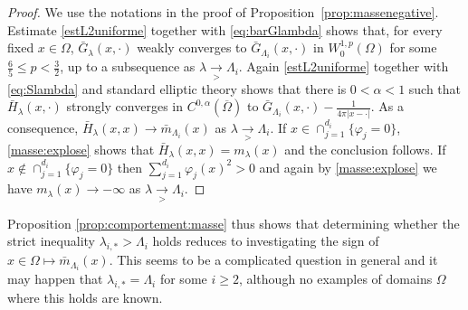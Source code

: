 \documentclass[10pt]{amsart}
\numberwithin{equation}{section}
\newcommand{\vp}{\varphi}
\newcommand{\Om}{\Omega}
\theoremstyle{plain}
\theoremstyle{remark}
\begin{document}
\begin{proof}
We use the notations in the proof of Proposition~\ref{prop:massenegative}. Estimate \eqref{estL2uniforme} together with \eqref{eq:barGlambda} shows that, for every fixed $x \in \Om$, $\bar{G}_\lambda(x, \cdot)$ weakly converges to $\bar{G}_{\Lambda_i}(x, \cdot)$ in $W^{1,p}_0(\Om)$ for some $ \frac{6}{5} \le p < \frac32$,  up to a subsequence as $\lambda\underset{> }{\to} \Lambda_{i}$. Again \eqref{estL2uniforme} together with \eqref{eq:Slambda} and standard elliptic theory shows that there is $0 < \alpha < 1$ such that $\bar{H}_\lambda(x, \cdot)$ strongly converges in $C^{0,\alpha}(\overline{\Om})$ to $\bar{G}_{\Lambda_i}(x, \cdot) - \frac{1}{4 \pi |x - \cdot|}$. As a consequence, $\bar{H}_\lambda(x,x) \to \bar{m}_{\Lambda_i}(x)$ as $\lambda\underset{> }{\to} \Lambda_{i}$. If $x \in \cap_{j=1}^{d_i} \{\vp_j = 0 \}$, \eqref{masse:explose} shows that $ \bar{H}_\lambda(x,x) =m_\lambda(x) $ and the conclusion follows. If $x \not \in \cap_{j=1}^{d_i} \{\vp_j = 0 \}$ then $\sum_{j=1}^{d_i} \vp_j(x)^2 >0$ and 
again by \eqref{masse:explose} we have $m_\lambda(x) \to - \infty $ as $\lambda\underset{> }{\to} \Lambda_{i}$. 
\end{proof}
Proposition \ref{prop:comportement:masse} thus shows that determining whether the strict inequality $\lambda_{i,*} > \Lambda_i$ holds reduces to investigating the sign of $x\in \Om \mapsto \bar{m}_{\Lambda_i}(x)$. This seems to be a complicated question in general and it may happen that $\lambda_{i,*} = \Lambda_i$ for some $i \ge 2$, although no examples of domains $\Om$ where this holds are known. 





\end{document}
